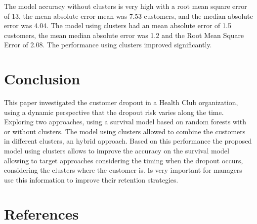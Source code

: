 \documentclass[
  12pt,
]{article}
\begin{document}
The model accuracy without clusters is very high with a root mean
square error of 13, the mean absolute error mean was 7.53 customers, and the median
absolute error was 4.04.
The model using clusters had an mean absolute error of 1.5 customers, the mean median absolute
error was 1.2 and the Root Mean Square Error of 2.08.
The performance using clusters improved significantly.

\hypertarget{conclusion}{%
\section{Conclusion}\label{conclusion}}

This paper investigated the customer dropout in a Health Club organization, using
a dynamic perspective that the dropout risk varies along the time.
Exploring two approaches, using a survival model based on random forests
with or without clusters.
The model using clusters allowed to combine the customers in different clusters,
an hybrid approach.
Based on this performance the proposed model using clusters allows to improve
the accuracy on the survival model allowing to target approaches considering
the timing when the dropout occurs, considering the clusters where the customer is.
Is very important for managers use this information to improve their retention
strategies.

\hypertarget{references}{%
\section*{References}\label{references}}
\end{document}
